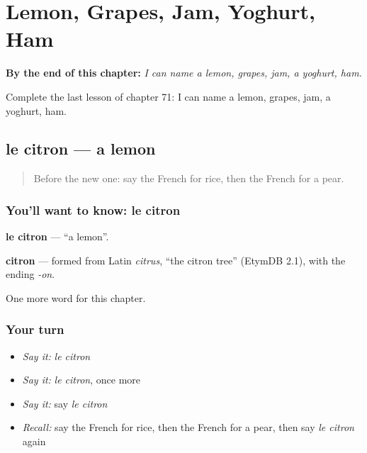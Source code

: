 
\chapter{Lemon, Grapes, Jam, Yoghurt, Ham}
\label{ch:fr-lemon-grapes-jam-yoghurt-ham}

\begin{chapteropening}
\textbf{By the end of this chapter:} \emph{I can name a lemon, grapes, jam, a yoghurt, ham.}

Complete the last lesson of chapter 71: I can name a lemon, grapes, jam, a yoghurt, ham.
\end{chapteropening}

\section[le citron]{le citron — a lemon}

\label{lesson:FR-C71-citron}



\begin{quote}
Before the new one: say the French for rice, then the French for a pear.
\end{quote}

\subsection*{You'll want to know: le citron}
\textbf{le citron} — \textquotedblleft{}a lemon\textquotedblright{}.

\begin{cousinweb}
\textbf{citron} — formed from Latin \emph{citrus}, \textquotedblleft{}the citron tree\textquotedblright{} (EtymDB 2.1), with the ending \emph{-on}.
\end{cousinweb}

\begin{grammarlens}[title={What you've built}]
One more word for this chapter.
\end{grammarlens}

\subsection*{Your turn}
\begin{itemize}
\raggedright
  \item \emph{Say it:} \emph{le citron}
  \item \emph{Say it:} \emph{le citron}, once more
  \item \emph{Say it:} say \emph{le citron}
  \item \emph{Recall:} say the French for rice, then the French for a pear, then say \emph{le citron} again
\end{itemize}

